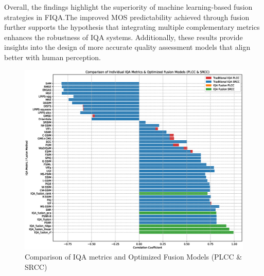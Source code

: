 Overall, the findings highlight the superiority of machine learning-based fusion strategies in FIQA.\@ The improved MOS predictability achieved through fusion further supports the hypothesis that integrating multiple complementary metrics enhances the robustness of IQA systems. Additionally, these results provide insights into the design of more accurate quality assessment models that align better with human perception.

\begin{figure}[htbp]
    \centering
    \includegraphics[width=\linewidth]{images/iqa_vs_fusion_iqa.eps}
    \caption{Comparison of IQA metrics and Optimized Fusion Models (PLCC \& SRCC)}\label{fig:final_comparison_grid}
\end{figure}